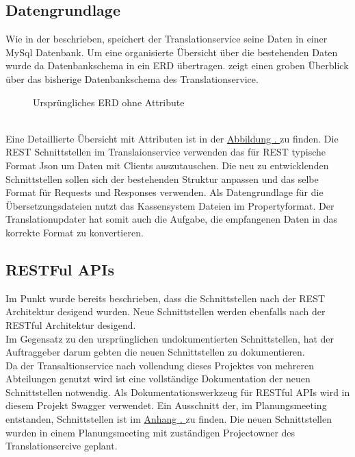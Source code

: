 \documentclass[10pt, oneside]{article}
\newcommand{\figsecref}[1]{\hyperref[{#1}]{Abbildung \thesubsection. \nameref*{#1}}}
\newcommand{\attsecref}[1]{\hyperref[{#1}]{Anhang \thesubsection. \nameref*{#1}}}
\newcommand{\secref}[1]{\hyperref[{#1}]{\nameref{#1}}}
\begin{document}
    \subsection{Datengrundlage} %
      Wie in der \secref{sec:architecture} beschrieben, speichert der Translationservice seine Daten in einer MySql Datenbank. Um eine organisierte Übersicht über die bestehenden Daten
      wurde da Datenbankschema in ein ERD übertragen.  zeigt einen groben Überblick über das bisherige Datenbankschema des Translationservice.\\
      \begin{figure}[ht]
        \label{fig:erd:na}
        \caption{Ursprüngliches ERD ohne Attribute}
      \end{figure}
      \\Eine Detaillierte Übersicht mit Attributen ist in der \figsecref{abb:erdIs1} zu finden. 
      Die REST Schnittstellen im Translaionservice verwenden das für REST typische Format Json um Daten mit Clients auszutauschen. Die neu zu entwicklenden Schnittstellen 
      sollen sich der bestehenden Struktur anpassen und das selbe Format für Requests und Responses verwenden.
      Als Datengrundlage für die Übersetzungsdateien nutzt das Kassensystem Dateien im Propertyformat. Der Translationupdater hat somit auch die Aufgabe, die empfangenen
      Daten in das korrekte Format zu konvertieren.
  \subsection{RESTFul APIs}
      Im Punkt  wurde bereits beschrieben, dass die Schnittstellen nach der REST Architektur desigend wurden. Neue Schnittstellen werden 
      ebenfalls nach der RESTful Architektur desigend.\\
      Im Gegensatz zu den ursprünglichen undokumentierten Schnittstellen, hat der Auftraggeber darum gebten die neuen Schnittstellen zu dokumentieren. \\
      Da der Transaltionservice nach vollendung dieses Projektes von mehreren Abteilungen genutzt wird ist eine vollständige Dokumentation der neuen Schnittstellen notwendig. 
      Als Dokumentationswerkzeug für RESTful APIs wird in diesem Projekt Swagger verwendet. Ein Ausschnitt der, im Planungsmeeting entstanden, Schnittstellen ist im \attsecref{sec:swa:ts} zu finden.
      Die neuen Schnittstellen wurden in einem Planungsmeeting mit zuständigen Projectowner des Translationsercive geplant.
\end{document}
